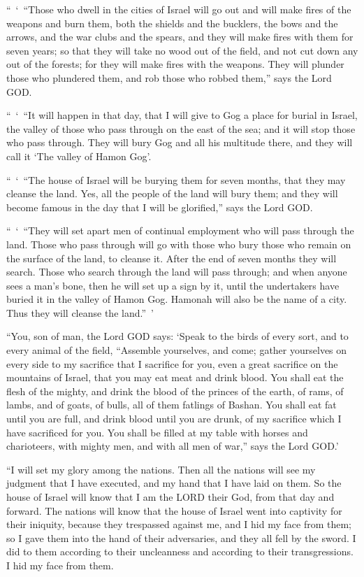 \myverse{}“ ‘ “Those who dwell in the cities of Israel will go out and will
make fires of the weapons and burn them, both the shields and the bucklers, the bows and the arrows, and
the war clubs and the spears, and they will make fires with them for seven years;
\myverse{}so that they will take no wood out of the field, and not cut down any out
of the forests; for they will make fires with the weapons. They will plunder those who plundered them,
and rob those who robbed them,” says the Lord GOD.

\myverse{}“ ‘ “It will happen in that day, that I will give to Gog a place
for burial in Israel, the valley of those who pass through on the east of the sea; and it will stop those
who pass through. They will bury Gog and all his multitude there, and they will call it ‘The valley of
Hamon Gog’.

\myverse{}“ ‘ “The house of Israel will be burying them for seven months,
that they may cleanse the land.
\myverse{}Yes, all the people of the land will bury them; and they will become famous
in the day that I will be glorified,” says the Lord GOD.

\myverse{}“ ‘ “They will set apart men of continual employment who will
pass through the land. Those who pass through will go with those who bury those who remain on the surface
of the land, to cleanse it. After the end of seven months they will search.
\myverse{}Those who search through the land will pass through; and when anyone sees
a man’s bone, then he will set up a sign by it, until the undertakers have buried it in the valley of
Hamon Gog.
\myverse{}Hamonah will also be the name of a city. Thus they will cleanse the land.” ’

\myverse{}“You, son of man, the Lord GOD says: ‘Speak to the birds of
every sort, and to every animal of the field, “Assemble yourselves, and come; gather yourselves on every
side to my sacrifice that I sacrifice for you, even a great sacrifice on the mountains of Israel, that
you may eat meat and drink blood.
\myverse{}You shall eat the flesh of the mighty, and drink the blood of the princes
of the earth, of rams, of lambs, and of goats, of bulls, all of them fatlings of Bashan.
\myverse{}You shall eat fat until you are full, and drink blood until you are drunk,
of my sacrifice which I have sacrificed for you.
\myverse{}You shall be filled at my table with horses and charioteers, with mighty
men, and with all men of war,” says the Lord GOD.’

\myverse{}“I will set my glory among the nations. Then all the nations
will see my judgment that I have executed, and my hand that I have laid on them.
\myverse{}So the house of Israel will know that I am the LORD their God, from that
day and forward.
\myverse{}The nations will know that the house of Israel went into captivity for their
iniquity, because they trespassed against me, and I hid my face from them; so I gave them into the hand
of their adversaries, and they all fell by the sword.
\myverse{}I did to them according to their uncleanness and according to their transgressions.
I hid my face from them.

